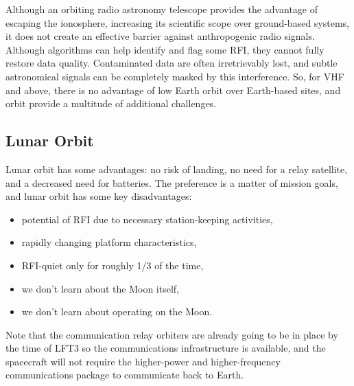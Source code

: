 Although an orbiting radio astronomy telescope provides the advantage of escaping the ionosphere, increasing its scientific scope over ground-based systems, it does not create an effective barrier against anthropogenic radio signals. Although algorithms can help identify and flag some RFI, they cannot fully restore data quality.  Contaminated data are often irretrievably lost, and subtle astronomical signals can be completely masked by this interference.  So, for VHF and above, there is no advantage of low Earth orbit over Earth-based sites, and orbit provide a multitude of additional challenges.

\subsection{Lunar Orbit}
Lunar orbit has some advantages: no risk of landing, no need for a relay satellite, and a decreased need for batteries.  The preference is a matter of mission goals, and lunar orbit has some key disadvantages:
\begin{itemize}
    \item potential of RFI due to necessary station-keeping activities,
    \item rapidly changing platform characteristics,
    \item RFI-quiet only for roughly 1/3 of the time,
    \item we don't learn about the Moon itself,
    \item we don't learn about operating on the Moon.
\end{itemize}
Note that the communication relay orbiters are already going to be in place by the time of LFT3 so the communications infrastructure is available, and the spacecraft will not require the higher-power and higher-frequency communications package to communicate back to Earth.


